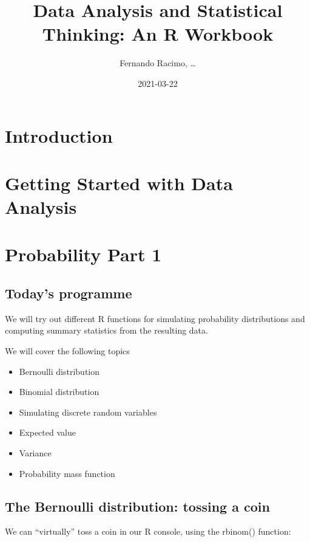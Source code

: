\documentclass[
]{book}
\title{Data Analysis and Statistical Thinking: An R Workbook}
\author{Fernando Racimo, \ldots{}}
\date{2021-03-22}
\providecommand{\tightlist}{%
  \setlength{\itemsep}{0pt}\setlength{\parskip}{0pt}}
\begin{document}
\maketitle

{
\setcounter{tocdepth}{1}
\tableofcontents
}
\hypertarget{introduction}{%
\chapter{Introduction}\label{introduction}}

\hypertarget{intro}{%
\chapter{Getting Started with Data Analysis}\label{intro}}

\hypertarget{prob1}{%
\chapter{Probability Part 1}\label{prob1}}

\hypertarget{todays-programme}{%
\section{Today's programme}\label{todays-programme}}

We will try out different R functions for simulating probability distributions and computing summary statistics from the resulting data.

We will cover the following topics

\begin{itemize}
\tightlist
\item
  Bernoulli distribution
\item
  Binomial distribution
\item
  Simulating discrete random variables
\item
  Expected value
\item
  Variance
\item
  Probability mass function
\end{itemize}

\hypertarget{the-bernoulli-distribution-tossing-a-coin}{%
\section{The Bernoulli distribution: tossing a coin}\label{the-bernoulli-distribution-tossing-a-coin}}

We can ``virtually'' toss a coin in our R console, using the rbinom() function:
\end{document}

